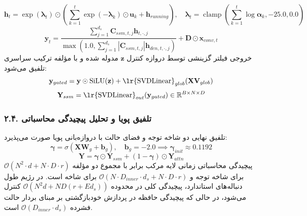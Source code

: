 \begin{equation}
\mathbf{h}_t = \exp(\boldsymbol{\lambda}_t) \odot \left( \sum_{k=1}^t \exp(-\boldsymbol{\lambda}_k) \odot \mathbf{u}_k + \mathbf{h}_{running} \right), \quad \boldsymbol{\lambda}_t = \operatorname{clamp}\left(\sum_{k=1}^t \log \boldsymbol{\alpha}_k, -25.0, 0.0\right)
\end{equation}
\begin{equation}
\mathbf{y}_t = \frac{\sum_{j=1}^{d_s} \mathbf{C}_{ssm, t, j} \mathbf{h}_{t, \cdot, j}}{\max\left(1.0, \sum_{j=1}^{d_s} |\mathbf{C}_{ssm, t, j}| \mathbf{h}_{den, t, \cdot, j}\right)} + \mathbf{D} \odot \mathbf{x}_{conv, t}
\end{equation}
خروجی فیلتر گزینشی توسط دروازه کنترل $\mathbf{z}$ مدوله شده و با مؤلفه ترکیب سراسری  تلفیق می‌شود:
\begin{equation}
\mathbf{y}_{gated} = \mathbf{y} \odot \operatorname{SiLU}(\mathbf{z}) + \text{\lr{SVDLinear}}_{glob}(\mathbf{X} \mathbf{V}_{glob})
\end{equation}
\begin{equation}
\mathbf{Y}_{ssm} = \text{\lr{SVDLinear}}_{out}(\mathbf{y}_{gated}) \in \mathbb{R}^{B \times N \times D}
\end{equation}

\subsubsection*{۲.۴. تلفیق پویا و تحلیل پیچیدگی محاسباتی}
تلفیق نهایی دو شاخه توجه و فضای حالت با دروازه‌بانی پویا صورت می‌پذیرد:
\begin{equation}
\boldsymbol{\gamma} = \sigma\left(\mathbf{X} \mathbf{W}_g + \mathbf{b}_g\right), \quad \mathbf{b}_g = -2.0 \implies \boldsymbol{\gamma}_{init} \approx 0.1192
\end{equation}
\begin{equation}
\mathbf{Y} = \boldsymbol{\gamma} \odot \mathbf{Y}_{ssm} + (1 - \boldsymbol{\gamma}) \odot \mathbf{Y}_{attn}
\end{equation}
پیچیدگی محاسباتی زمانی لایه مرکب برابر با مجموع دو مؤلفه $\mathcal{O}(N^2 \cdot d + N \cdot D \cdot r)$ برای شاخه توجه و $\mathcal{O}(N \cdot D_{inner} \cdot d_s + N \cdot D \cdot r)$ برای شاخه  است. در رژیم طول دنباله‌های استاندارد، پیچیدگی کلی در محدوده $\mathcal{O}(N^2 d + N D (r + E d_s))$ کنترل می‌شود، در حالی که پیچیدگی حافظه در پردازش خودبازگشتی بر مبنای بردار حالت فشرده $\mathcal{O}(D_{inner} \cdot d_s)$ است.


